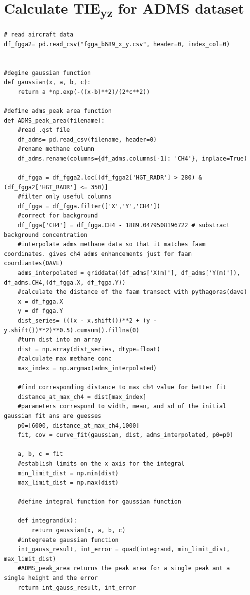 \documentclass[12pt]{article}
\begin{document}
\section{Calculate TIE\textsubscript{yz} for ADMS dataset}

\begin{lstlisting}
# read aircraft data
df_fgga2= pd.read_csv("fgga_b689_x_y.csv", header=0, index_col=0)


#degine gaussian function 
def gaussian(x, a, b, c):
    return a *np.exp(-((x-b)**2)/(2*c**2))

#define adms_peak area function
def ADMS_peak_area(filename):
    #read_.gst file
    df_adms= pd.read_csv(filename, header=0)
    #rename methane column
    df_adms.rename(columns={df_adms.columns[-1]: 'CH4'}, inplace=True)
   
    df_fgga = df_fgga2.loc[(df_fgga2['HGT_RADR'] > 280) & (df_fgga2['HGT_RADR'] <= 350)]
    #filter only useful columns
    df_fgga = df_fgga.filter(['X','Y','CH4'])
    #correct for background
    df_fgga['CH4'] = df_fgga.CH4 - 1889.0479508196722 # substract background concentration
    #interpolate adms methane data so that it matches faam coordinates. gives ch4 adms enhancements just for faam coordiantes(DAVE)
    adms_interpolated = griddata((df_adms['X(m)'], df_adms['Y(m)']), df_adms.CH4,(df_fgga.X, df_fgga.Y))
    #calculate the distance of the faam transect with pythagoras(dave)
    x = df_fgga.X
    y = df_fgga.Y
    dist_series= (((x - x.shift())**2 + (y - y.shift())**2)**0.5).cumsum().fillna(0)
    #turn dist into an array
    dist = np.array(dist_series, dtype=float)
    #calculate max methane conc
    max_index = np.argmax(adms_interpolated)

    #find corresponding distance to max ch4 value for better fit 
    distance_at_max_ch4 = dist[max_index]
    #parameters correspond to width, mean, and sd of the initial gaussian fit ans are guesses
    p0=[6000, distance_at_max_ch4,1000]
    fit, cov = curve_fit(gaussian, dist, adms_interpolated, p0=p0)

    a, b, c = fit
    #establish limits on the x axis for the integral
    min_limit_dist = np.min(dist)
    max_limit_dist = np.max(dist)
    
    #define integral function for gaussian function 

    def integrand(x):
        return gaussian(x, a, b, c)
    #integreate gaussian function 
    int_gauss_result, int_error = quad(integrand, min_limit_dist, max_limit_dist)
    #ADMS_peak_area returns the peak area for a single peak ant a single height and the error 
    return int_gauss_result, int_error


\end{lstlisting}
\end{document}
